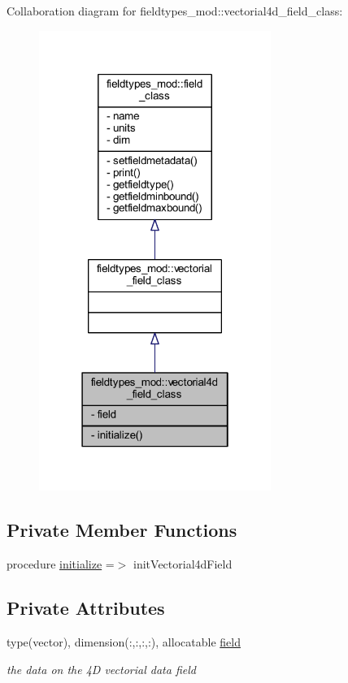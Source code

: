 Collaboration diagram for fieldtypes\+\_\+mod\+:\+:vectorial4d\+\_\+field\+\_\+class\+:\nopagebreak
\begin{figure}[H]
\begin{center}
\leavevmode
\includegraphics[width=214pt]{structfieldtypes__mod_1_1vectorial4d__field__class__coll__graph}
\end{center}
\end{figure}
\subsection*{Private Member Functions}
\begin{DoxyCompactItemize}
\item 
procedure \mbox{\hyperlink{structfieldtypes__mod_1_1vectorial4d__field__class_a4c87f50257a0c76534894e2ac4f1088e}{initialize}} =$>$ init\+Vectorial4d\+Field
\end{DoxyCompactItemize}
\subsection*{Private Attributes}
\begin{DoxyCompactItemize}
\item 
type(vector), dimension(\+:,\+:,\+:,\+:), allocatable \mbox{\hyperlink{structfieldtypes__mod_1_1vectorial4d__field__class_a85ba919e29b243522393615f90cb6abe}{field}}
\begin{DoxyCompactList}\small\item\em the data on the 4D vectorial data field \end{DoxyCompactList}\end{DoxyCompactItemize}


